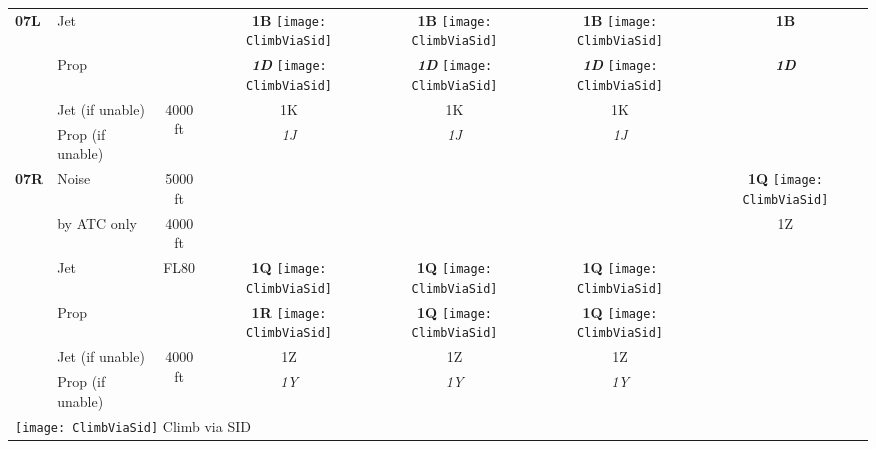 \documentclass[10pt,landscape,a4paper]{article}
\begin{document}
\begin{textblock}{30}
\begin{table}
\begin{tabular}{|l|l|c|c|c|c|c|}
\textbf{07L} & Jet &  & \textbf{1B} \texttt{[image: ClimbViaSid]} & \textbf{1B} \texttt{[image: ClimbViaSid]} & \textbf{1B} \texttt{[image: ClimbViaSid]} & \textbf{1B} \\ \cline{2-2} \cline{4-7}
& Prop & & \textbf{\textit{1D}} \texttt{[image: ClimbViaSid]} & \textbf{\textit{1D}} \texttt{[image: ClimbViaSid]} & \textbf{\textit{1D}} \texttt{[image: ClimbViaSid]} & \textbf{\textit{1D}} \\ \cline{2-7}
& Jet (if unable) & \multirow{2}{*}{4000 ft} & 1K & 1K & 1K & \\ \cline{2-2} \cline{4-7}
& Prop (if unable) & & \textit{1J} & \textit{1J} & \textit{1J} &  \\ \hline

\textbf{07R} & Noise & 5000 ft & & & & \textbf{1Q} \texttt{[image: ClimbViaSid]} \\ \cline{2-7}
& by ATC only & 4000 ft & & & & 1Z \\ \cline{2-7}
& Jet & \multirow{2}{*}{FL80} & \textbf{1Q} \texttt{[image: ClimbViaSid]} & \textbf{1Q} \texttt{[image: ClimbViaSid]} & \textbf{1Q} \texttt{[image: ClimbViaSid]} & \\ \cline{2-2} \cline{4-7}
& Prop & & \textbf{1R} \texttt{[image: ClimbViaSid]} & \textbf{1Q} \texttt{[image: ClimbViaSid]} & \textbf{1Q} \texttt{[image: ClimbViaSid]} & \\ \cline{2-7}
& Jet (if unable) & \multirow{2}{*}{4000 ft} & 1Z & 1Z & 1Z & \\ \cline{2-2} \cline{4-7}
& Prop (if unable) & & \textit{1Y} & \textit{1Y} & \textit{1Y} &  \\ \hline

\multicolumn{7}{l}{\texttt{[image: ClimbViaSid]} \color{red}Climb via SID} \\
\end{tabular}
\end{table}
\end{textblock}
\end{document}
